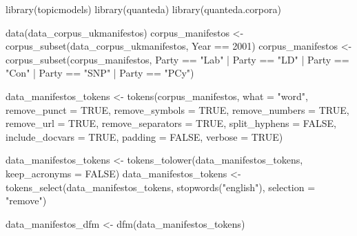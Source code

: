 \documentclass[
]{book}
\newenvironment{Shaded}{\begin{snugshade}}{\end{snugshade}}
\newcommand{\AttributeTok}[1]{\textcolor[rgb]{0.77,0.63,0.00}{#1}}
\newcommand{\ConstantTok}[1]{\textcolor[rgb]{0.00,0.00,0.00}{#1}}
\newcommand{\DecValTok}[1]{\textcolor[rgb]{0.00,0.00,0.81}{#1}}
\newcommand{\FunctionTok}[1]{\textcolor[rgb]{0.00,0.00,0.00}{#1}}
\newcommand{\NormalTok}[1]{#1}
\newcommand{\OtherTok}[1]{\textcolor[rgb]{0.56,0.35,0.01}{#1}}
\newcommand{\SpecialCharTok}[1]{\textcolor[rgb]{0.00,0.00,0.00}{#1}}
\newcommand{\StringTok}[1]{\textcolor[rgb]{0.31,0.60,0.02}{#1}}
\begin{document}
\begin{Shaded}
\begin{Highlighting}[]
\FunctionTok{library}\NormalTok{(topicmodels)}
\FunctionTok{library}\NormalTok{(quanteda)}
\FunctionTok{library}\NormalTok{(quanteda.corpora)}

\FunctionTok{data}\NormalTok{(data\_corpus\_ukmanifestos)}
\NormalTok{corpus\_manifestos }\OtherTok{\textless{}{-}} \FunctionTok{corpus\_subset}\NormalTok{(data\_corpus\_ukmanifestos, }
\NormalTok{    Year }\SpecialCharTok{==} \DecValTok{2001}\NormalTok{)}
\NormalTok{corpus\_manifestos }\OtherTok{\textless{}{-}} \FunctionTok{corpus\_subset}\NormalTok{(corpus\_manifestos, Party }\SpecialCharTok{==} 
    \StringTok{"Lab"} \SpecialCharTok{|}\NormalTok{ Party }\SpecialCharTok{==} \StringTok{"LD"} \SpecialCharTok{|}\NormalTok{ Party }\SpecialCharTok{==} \StringTok{"Con"} \SpecialCharTok{|}\NormalTok{ Party }\SpecialCharTok{==} \StringTok{"SNP"} \SpecialCharTok{|} 
\NormalTok{    Party }\SpecialCharTok{==} \StringTok{"PCy"}\NormalTok{)}

\NormalTok{data\_manifestos\_tokens }\OtherTok{\textless{}{-}} \FunctionTok{tokens}\NormalTok{(corpus\_manifestos, }\AttributeTok{what =} \StringTok{"word"}\NormalTok{, }
    \AttributeTok{remove\_punct =} \ConstantTok{TRUE}\NormalTok{, }\AttributeTok{remove\_symbols =} \ConstantTok{TRUE}\NormalTok{, }\AttributeTok{remove\_numbers =} \ConstantTok{TRUE}\NormalTok{, }
    \AttributeTok{remove\_url =} \ConstantTok{TRUE}\NormalTok{, }\AttributeTok{remove\_separators =} \ConstantTok{TRUE}\NormalTok{, }\AttributeTok{split\_hyphens =} \ConstantTok{FALSE}\NormalTok{, }
    \AttributeTok{include\_docvars =} \ConstantTok{TRUE}\NormalTok{, }\AttributeTok{padding =} \ConstantTok{FALSE}\NormalTok{, }\AttributeTok{verbose =} \ConstantTok{TRUE}\NormalTok{)}

\NormalTok{data\_manifestos\_tokens }\OtherTok{\textless{}{-}} \FunctionTok{tokens\_tolower}\NormalTok{(data\_manifestos\_tokens, }
    \AttributeTok{keep\_acronyms =} \ConstantTok{FALSE}\NormalTok{)}
\NormalTok{data\_manifestos\_tokens }\OtherTok{\textless{}{-}} \FunctionTok{tokens\_select}\NormalTok{(data\_manifestos\_tokens, }
    \FunctionTok{stopwords}\NormalTok{(}\StringTok{"english"}\NormalTok{), }\AttributeTok{selection =} \StringTok{"remove"}\NormalTok{)}

\NormalTok{data\_manifestos\_dfm }\OtherTok{\textless{}{-}} \FunctionTok{dfm}\NormalTok{(data\_manifestos\_tokens)}
\end{Highlighting}
\end{Shaded}
\end{document}
